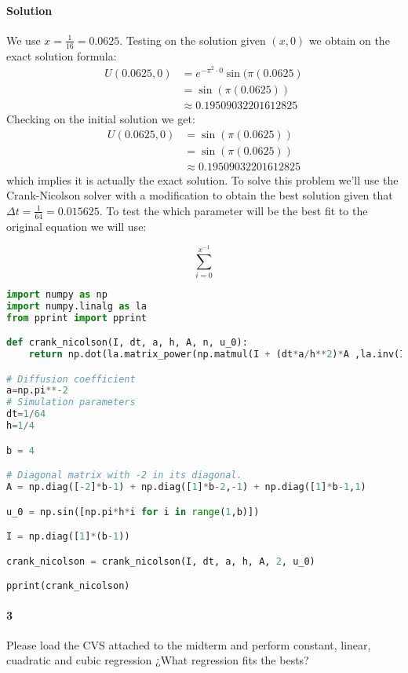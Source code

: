 \documentclass{article}
\begin{document}
\paragraph{Solution} We use $x = \frac{1}{16} = 0.0625$. Testing on the solution given $(x,0)$ we obtain on the exact solution formula:
\begin{align*}
	U(0.0625,0) &= e^{-\pi^2 \cdot 0} \sin{(\pi(0.0625)}\\
	&= \sin{(\pi(0.0625))}\\
	&\approx 0.19509032201612825 
\end{align*}
Checking on the initial solution we get:
\begin{align*}
	U(0.0625,0) &= \sin{(\pi(0.0625))}\\
	&= \sin{(\pi(0.0625))}\\
	&\approx 0.19509032201612825 
\end{align*}
which implies it is actually the exact solution. To solve this problem we'll use the Crank-Nicolson solver with a modification to obtain the best solution given that $\Delta t =  \frac{1}{64} = 0.015625$. To test the which parameter will be the best fit to the original equation we will use:

$$\sum_{i=0}^{x^{-1}}$$
\begin{lstlisting}[language=python]
import numpy as np
import numpy.linalg as la
from pprint import pprint

def crank_nicolson(I, dt, a, h, A, n, u_0):
	return np.dot(la.matrix_power(np.matmul(I + (dt*a/h**2)*A ,la.inv(I - A*(a*dt/h**2))), n), u_0)

# Diffusion coefficient
a=np.pi**-2
# Simulation parameters
dt=1/64
h=1/4

b = 4

# Diagonal matrix with -2 in its diagonal.
A = np.diag([-2]*b-1) + np.diag([1]*b-2,-1) + np.diag([1]*b-1,1)

u_0 = np.sin([np.pi*h*i for i in range(1,b)])

I = np.diag([1]*(b-1))

crank_nicolson = crank_nicolson(I, dt, a, h, A, 2, u_0)

pprint(crank_nicolson)
\end{lstlisting}
\paragraph{3} Please load the CVS attached to the midterm and perform constant, linear, cuadratic and cubic regression ¿What regression fits the bests?
\end{document}
